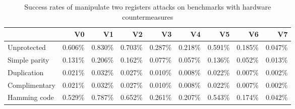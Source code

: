 \begin{table}
  \centering
  \caption{Success rates of manipulate two registers attacks on benchmarks with hardware countermeasures}
  \label{tab:manipulates}
\begin{tabular}{lrrrrrrrr}
\hline
& V0 & V1 & V2 & V3 & V4 & V5 & V6 & V7\\
                          \hline
Unprotected                  & 0.606\%                                       & 0.830\%                                       & 0.703\%                                      & 0.287\%                                      & 0.218\%                                       & 0.591\%                                       & 0.185\%                                       & 0.047\%                                       \\
\hline
Simple parity             & 0.131\%                                      & 0.206\%                                      & 0.162\%                                      & 0.077\%                                      & 0.057\%                                      & 0.136\%                                       & 0.052\%                                      & 0.013\%                                       \\
\hline
Duplication               & 0.021\%                                      & 0.032\%                                       & 0.027\%                                      & 0.010\%                                      & 0.008\%                                      & 0.022\%                                       & 0.007\%                                      & 0.002\%                                       \\
\hline
Complimentary & 0.021\%                                      & 0.032\%                                       & 0.027\%                                      & 0.010\%                                      & 0.008\%                                      & 0.022\%                                       & 0.007\%                                      & 0.002\%                                       \\
\hline
Hamming code              & 0.529\%                                        & 0.787\%                                       & 0.652\%                                      & 0.261\%                                     & 0.207\%                                      & 0.543\%                                       & 0.174\%                                      & 0.042\%                                       \\

\end{tabular}
\end{table}
